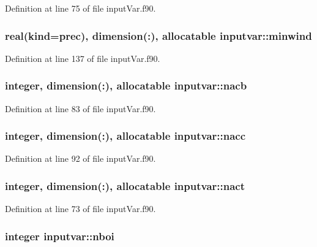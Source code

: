Definition at line 75 of file input\-Var.\-f90.

\hypertarget{classinputvar_abb9cb8ca38b7592b52f30836a6755584}{
\subsubsection[{minwind}]{\setlength{\rightskip}{0pt plus 5cm}real(kind=prec), dimension(\-:), allocatable inputvar\-::minwind}}\label{classinputvar_abb9cb8ca38b7592b52f30836a6755584}


Definition at line 137 of file input\-Var.\-f90.

\hypertarget{classinputvar_ae517f545e388b4352b7941203efa8449}{
\subsubsection[{nacb}]{\setlength{\rightskip}{0pt plus 5cm}integer, dimension(\-:), allocatable inputvar\-::nacb}}\label{classinputvar_ae517f545e388b4352b7941203efa8449}


Definition at line 83 of file input\-Var.\-f90.

\hypertarget{classinputvar_a8e4bb497a3825e6f554e3268dd2bbd63}{
\subsubsection[{nacc}]{\setlength{\rightskip}{0pt plus 5cm}integer, dimension(\-:), allocatable inputvar\-::nacc}}\label{classinputvar_a8e4bb497a3825e6f554e3268dd2bbd63}


Definition at line 92 of file input\-Var.\-f90.

\hypertarget{classinputvar_aecb7a7ef500aee2174166b23b5c72e2a}{
\subsubsection[{nact}]{\setlength{\rightskip}{0pt plus 5cm}integer, dimension(\-:), allocatable inputvar\-::nact}}\label{classinputvar_aecb7a7ef500aee2174166b23b5c72e2a}


Definition at line 73 of file input\-Var.\-f90.

\hypertarget{classinputvar_a168bc1dcb73e68b3620991b6494f3797}{
\subsubsection[{nboi}]{\setlength{\rightskip}{0pt plus 5cm}integer inputvar\-::nboi}}\label{classinputvar_a168bc1dcb73e68b3620991b6494f3797}


